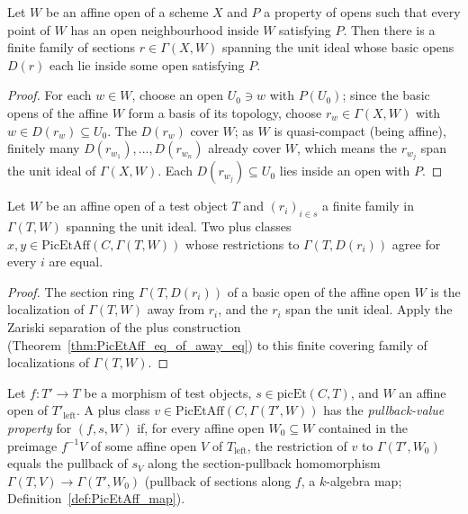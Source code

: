 \begin{theorem}
  \label{thm:exists_basic_subcover}
  \leanok
  Let \(W\) be an affine open of a scheme \(X\) and \(P\) a property of opens such that every point
  of \(W\) has an open neighbourhood inside \(W\) satisfying \(P\). Then there is a finite family of
  sections \(r \in \Gamma(X, W)\) spanning the unit ideal whose basic opens \(D(r)\) each lie inside
  some open satisfying \(P\).
\end{theorem}
\begin{proof}
  \leanok
  For each \(w \in W\), choose an open \(U_0 \ni w\) with \(P(U_0)\); since the basic opens of the
  affine \(W\) form a basis of its topology, choose \(r_w \in \Gamma(X, W)\) with \(w \in D(r_w)
  \subseteq U_0\). The \(D(r_w)\) cover \(W\); as \(W\) is quasi-compact (being affine), finitely
  many \(D(r_{w_1}), \dots, D(r_{w_n})\) already cover \(W\), which means the \(r_{w_j}\) span the
  unit ideal of \(\Gamma(X, W)\). Each \(D(r_{w_j}) \subseteq U_0\) lies inside an open with \(P\).
\end{proof}

\begin{theorem}
  \label{thm:picEt_eq_of_basic_eq}
  \leanok
  Let \(W\) be an affine open of a test object \(T\) and \((r_i)_{i \in s}\) a finite family in
  \(\Gamma(T, W)\) spanning the unit ideal. Two plus classes \(x, y \in \mathrm{PicEtAff}(C,
  \Gamma(T, W))\) whose restrictions to \(\Gamma(T, D(r_i))\) agree for every \(i\) are equal.
\end{theorem}
\begin{proof}
  \leanok
  The section ring \(\Gamma(T, D(r_i))\) of a basic open of the affine open \(W\) is the
  localization of \(\Gamma(T, W)\) away from \(r_i\), and the \(r_i\) span the unit ideal. Apply the
  Zariski separation of the plus construction (Theorem~\ref{thm:PicEtAff_eq_of_away_eq}) to this
  finite covering family of localizations of \(\Gamma(T, W)\).
\end{proof}

\begin{definition}
  \label{def:picEt_IsPullbackValue}
  \leanok
  Let \(f \colon T' \to T\) be a morphism of test objects, \(s \in \mathrm{picEt}(C, T)\), and
  \(W\) an affine open of \(T'_{\mathrm{left}}\). A plus class \(v \in \mathrm{PicEtAff}(C,
  \Gamma(T', W))\) has the \emph{pullback-value property} for \((f, s, W)\) if, for every affine
  open \(W_0 \subseteq W\) contained in the preimage \(f^{-1}V\) of some affine open \(V\) of
  \(T_{\mathrm{left}}\), the restriction of \(v\) to \(\Gamma(T', W_0)\) equals the pullback of
  \(s_V\) along the section-pullback homomorphism \(\Gamma(T, V) \to \Gamma(T', W_0)\) (pullback of
  sections along \(f\), a \(k\)-algebra map; Definition~\ref{def:PicEtAff_map}).
\end{definition}

